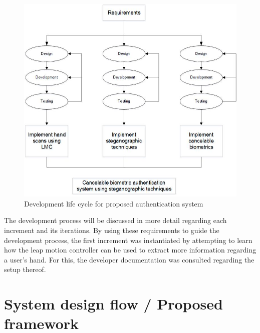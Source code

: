     
    \begin{figure}[htbp!] 
    \centering    
    \includegraphics[width=1.0\textwidth]{Chapter3/Figs/Development_Cycle_for_Proposed_Authentication_System.jpg}
    \caption[Development life cycle for proposed authentication system]{Development life cycle for proposed authentication system}
    \label{fig:Development life cycle for proposed authentication system}
    \end{figure}
    
	
The development process will be discussed in more detail regarding each increment and its iterations.
By using these requirements to guide the development process, the first increment was instantiated by attempting to learn how the leap motion controller can be used to extract more information regarding a user’s hand. For this, the developer documentation was consulted regarding the setup thereof.

\section{System design flow / Proposed framework}

